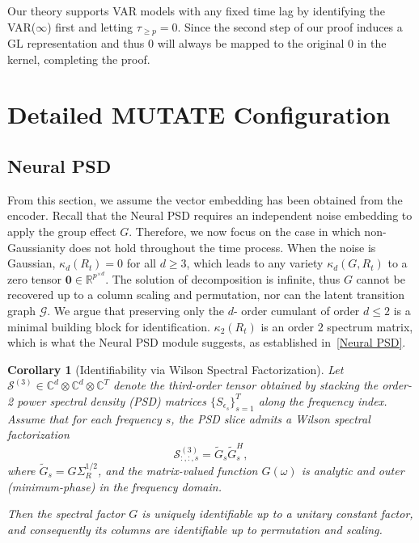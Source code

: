 \documentclass[10pt]{article}
\newcommand{\GL}{\mathrm{GL}}
\numberwithin{figure}{section}
\newtheorem{corollary}{Corollary}[theorem]
\begin{document}
Our theory supports VAR models with any fixed time lag by identifying the VAR($\infty$) first and letting $\tau_{\ge p}=0$. Since the second step of our proof induces a $\GL$ representation and thus $0$ will always be mapped to the original $0$ in the kernel, completing the proof.




\section{Detailed MUTATE Configuration}

\subsection{Neural PSD}

From this section, we assume the vector embedding has been obtained from the encoder.  Recall that the Neural PSD requires an independent noise embedding to apply the group effect $G$. Therefore, we now focus on the case in which non-Gaussianity does not hold throughout the time process. When the noise is Gaussian, $\kappa_d(R_t) = 0$ for all $d \ge 3$, which leads to any variety $\kappa_d(G,R_t)$ to a zero tensor $\mathbf{0} \in \mathbb{R}^{p^{\times d}}$. The solution of decomposition is infinite, thus $G$ cannot be recovered up to a column scaling and permutation, nor can the latent transition graph $\mathcal{G}$.  We argue that preserving only the $d$- order cumulant of order $d \le 2$ is a minimal building block for identification.  $\kappa_2 (R_t)$ is an order $2$ spectrum matrix, which is what the Neural PSD module suggests, as established in~\autoref{Neural PSD}.
\begin{corollary}[Identifiability via Wilson Spectral Factorization]\label{Neural PSD}
Let $\mathcal{S}^{(3)} \in \mathbb{C}^{d} \otimes \mathbb{C}^{d} \otimes \mathbb{C}^{T}$ denote the third-order tensor obtained by stacking the order-2 power spectral density (PSD) matrices $\{S_{\epsilon_s}\}_{s=1}^T$ along the frequency index.
Assume that for each frequency $s$, the PSD slice admits a Wilson spectral factorization
\[
\mathcal{S}^{(3)}_{:,:,s}
=
\tilde G_s \tilde G_s^{H},
\]
where $\tilde G_s = G \Sigma_R^{1/2}$, and the matrix-valued function $G(\omega)$ is analytic and outer (minimum-phase) in the frequency domain.

Then the spectral factor $G$ is uniquely identifiable up to a unitary constant factor, and consequently its columns are identifiable up to permutation and scaling.
\end{corollary}
\end{document}
